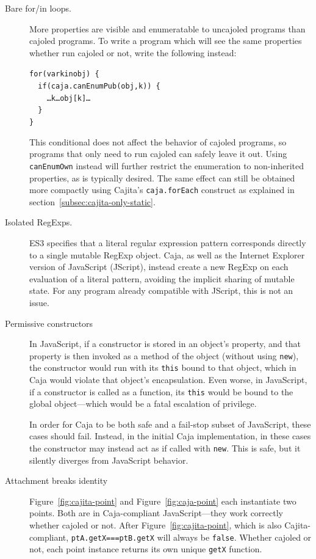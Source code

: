 \documentclass[letterpaper,twocolumn,10pt]{article}
\newcommand{\code}[1]{{\tt {#1}}}              %
\begin{document}
\begin{description}

  \item[Bare for/in loops.] More properties are visible and enumeratable to 
  uncajoled programs than cajoled programs. To write a program which 
  will see the same properties whether run cajoled or not, write the 
  following instead:
%
\begin{alltt}
for (var k in obj)\ \{ 
\ \ if (caja.canEnumPub(obj,k))\ \{
\ \ \ \ {\ldots}k{\ldots}obj[k]\ldots
\ \ \}
\}
\end{alltt}
%
  This conditional does not affect the behavior of cajoled programs, so
  programs that only need to run cajoled can safely leave it out. Using
  \code{canEnumOwn} instead will further restrict the enumeration to
  non-inherited properties, as is typically desired. The same effect can still
  be obtained more compactly using Cajita's \code{caja.forEach} construct as
  explained in section~\ref{subsec:cajita-only-static}.

  \item[Isolated RegExps.] ES3 specifies that a literal regular expression 
  pattern corresponds directly to a single mutable RegExp object. Caja, as 
  well as the Internet Explorer version of JavaScript (JScript), instead 
  create a new RegExp on each evaluation of a literal pattern, avoiding the 
  implicit sharing of mutable state. For any program already compatible with 
  JScript, this is not an issue.
  
  \item[Permissive constructors] In JavaScript, if a constructor is stored in an 
  object's property, and that property is then invoked as a method of 
  the object (without using \code{new}), the constructor would run with its 
  \code{this} bound to that object, which in Caja would violate that object's 
  encapsulation. Even worse, in JavaScript, if a constructor is called 
  as a function, its \code{this} would be bound to the global 
  object---which would be a fatal escalation of privilege.
  
  In order for Caja to be both safe and a fail-stop subset of JavaScript, 
  these cases should fail. Instead, in the initial Caja implementation, in 
  these cases the constructor may instead act as if called with \code{new}. 
  This is safe, but it silently diverges from JavaScript behavior.
  
  \item[Attachment breaks identity] Figure~\ref{fig:cajita-point} and 
  Figure~\ref{fig:caja-point} each instantiate two points. Both are in 
  Caja-compliant JavaScript---they work correctly whether cajoled or not. 
  After Figure~\ref{fig:cajita-point}, which is also Cajita-compliant, 
  \code{ptA.getX===ptB.getX} will always be \code{false}. Whether cajoled or 
  not, each point instance returns its own unique \code{getX} function.
  

\end{description}
\end{document}
